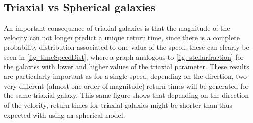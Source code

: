 	\subsection{Triaxial vs Spherical galaxies}
	An important consequence of triaxial galaxies is that the magnitude of the velocity can not longer predict a unique return time, since there is a complete probability distribution associated to one value of the speed, these can clearly be seen in \autoref{fig: timeSpeedDist}, where a graph analogous to \autoref{fig: stellarfraction} for the galaxies with lower and higher values of the triaxial parameter. These results are particularly important as for a single speed, depending on the direction, two very different (almost one order of magnitude) return times will be generated for the same triaxial galaxy. This same figure shows that depending on the direction of the velocity, return times for triaxial galaxies might be shorter than thus expected with using an spherical model.
